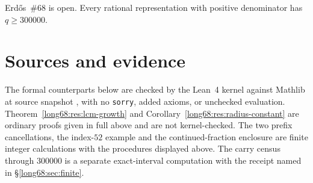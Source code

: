 \medskip
\noindent Erd\H{o}s~\#68 is open.  Every rational representation with
positive denominator has $q\ge300000$.

\section*{Sources and evidence}

The formal counterparts below are checked by the Lean~4 kernel against
Mathlib at source snapshot \texttt{\commitshort}, with no \texttt{sorry},
added axioms, or unchecked evaluation.  Theorem~\ref{long68:res:lcm-growth} and
Corollary~\ref{long68:res:radius-constant} are ordinary proofs given in full above
and are not kernel-checked.  The two prefix cancellations, the index-$52$
example and the continued-fraction enclosure are finite integer calculations
with the procedures displayed above.  The carry census through $300000$ is a
separate exact-interval computation with the receipt named in
\S\ref{long68:sec:finite}.

